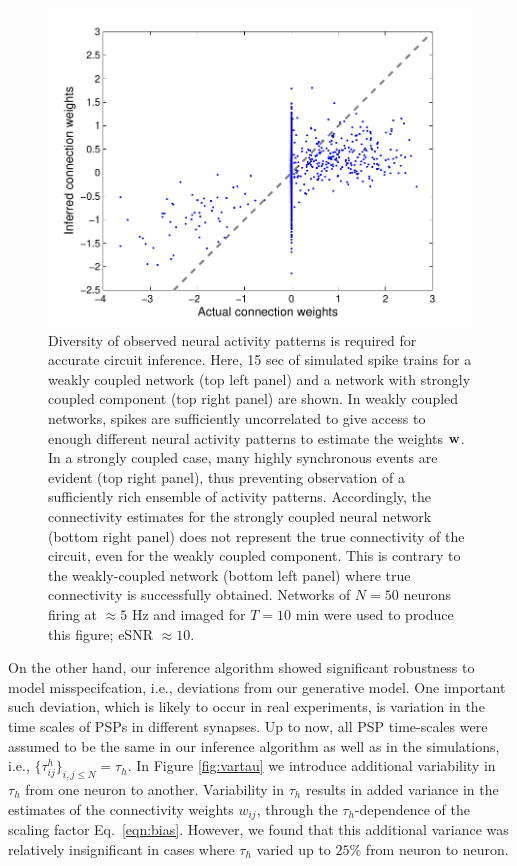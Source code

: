 \documentclass[aoas,preprint]{imsart}
\begin{document}
\begin{figure}[t!]
\begin{minipage}[c]{0.45\hsize}
\end{minipage}
\begin{minipage}[c]{0.45\hsize}
\includegraphics[width=\hsize]{../figs/FigureA8_strong_corr}
\end{minipage}
\caption{Diversity of observed neural activity patterns is required
for accurate circuit inference. Here, 15 sec of
simulated spike trains for a weakly coupled network (top left panel)
and a network with strongly coupled component (top right panel) are
shown. In weakly coupled networks, spikes are sufficiently
uncorrelated to give access to enough different neural activity
patterns to estimate the weights ${\bf w}$. In a strongly coupled
case, many highly synchronous events are evident (top right panel),
thus preventing observation of a sufficiently rich ensemble of activity
patterns. Accordingly, the connectivity estimates for the strongly
coupled neural network (bottom right panel) does not represent the
true connectivity of the circuit, even for the weakly coupled
component. This is contrary to the weakly-coupled network (bottom left
panel) where true connectivity is successfully obtained. Networks of
$N=50$ neurons firing at $\approx 5$ Hz and imaged for $T=10$ min were
used to produce this figure; eSNR $\approx 10$.}
\label{fig:rasters}
\end{figure}

On the other hand, our inference algorithm showed significant
robustness to model misspecifcation, i.e., deviations from our
generative model. One important such deviation, which is likely to
occur in real experiments, is variation in the time scales of PSPs in
different synapses. Up to now, all PSP time-scales were assumed to be
the same in our inference algorithm as well as in the simulations,
i.e., $\{\tau^h_{ij}\}_{i,j\leq N}=\tau_h$. In Figure \ref{fig:vartau}
we introduce additional variability in $\tau_h$ from one neuron to
another. Variability in $\tau_h$ results in added variance in the
estimates of the connectivity weights $w_{ij}$, through the
$\tau_h$-dependence of the scaling factor Eq.~\eqref{eqn:bias}.
However, we found that this additional variance was relatively
insignificant in cases where $\tau_h$ varied up to $25\%$ from neuron
to neuron.
\end{document}
